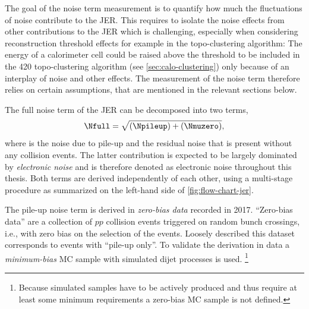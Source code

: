 The goal of the noise term measurement is to quantify how much the fluctuations of noise contribute to the JER.
This requires to isolate the noise effects from other contributions to the JER which is challenging, especially when considering reconstruction threshold effects for example in the topo-clustering algorithm:
The energy of a calorimeter cell could be raised above the threshold to be included in the 420 topo-clustering algorithm (see \cref{sec:calo-clustering}) only because of an interplay of noise and other effects. The measurement of the noise term therefore relies on certain assumptions, that are mentioned in the relevant sections below.

The full noise term of the JER can be decomposed into two terms,
\begin{equation}
    \Nfull = \sqrt{ \left(\Npileup \right) +  \left( \Nmuzero \right) },
\end{equation}
where \Npileup is the noise due to pile-up and \Nmuzero the residual noise that is present without any collision events.
The latter contribution is expected to be largely dominated by \emph{electronic noise} and is therefore denoted as electronic noise throughout this thesis.
Both terms are derived independently of each other,  using a multi-stage procedure as summarized on the left-hand side of \cref{fig:flow-chart-jer}.

The pile-up noise term is derived in \emph{zero-bias data} recorded in 2017. ``Zero-bias data'' are a collection of $pp$ collision events triggered on random bunch crossings, i.e., with zero bias on the selection of the events. Loosely described this dataset corresponds to events with ``pile-up only''. To validate the derivation in data a \emph{minimum-bias} MC sample with simulated dijet processes is used.
\footnote{Because simulated samples have to be actively produced and thus require at least some minimum requirements a zero-bias MC sample is not defined.}

